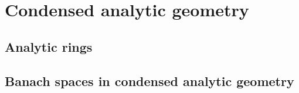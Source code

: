 \section{Condensed analytic geometry}
    \subsection{Analytic rings}
    
    \subsection{Banach spaces in condensed analytic geometry}